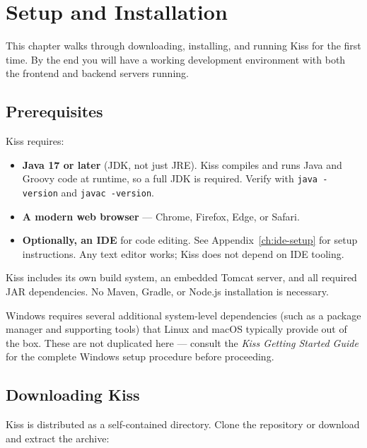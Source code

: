 \chapter{Setup and Installation}
\label{ch:setup}

This chapter walks through downloading, installing, and running Kiss for the first time.  By the end you will have a working development environment with both the frontend and backend servers running.

\section{Prerequisites}
\label{sec:setup-prerequisites}

Kiss requires:

\begin{itemize}
  \item \textbf{Java 17 or later} (JDK, not just JRE).  Kiss compiles and runs Java and Groovy code at runtime, so a full JDK is required.  Verify with \texttt{java -version} and \texttt{javac -version}.
  \item \textbf{A modern web browser} --- Chrome, Firefox, Edge, or Safari.
  \item \textbf{Optionally, an IDE} for code editing.  See Appendix~\ref{ch:ide-setup} for setup instructions.  Any text editor works; Kiss does not depend on IDE tooling.
\end{itemize}

\begin{notebox}
Kiss includes its own build system, an embedded Tomcat server, and all required JAR dependencies.  No Maven, Gradle, or Node.js installation is necessary.
\end{notebox}

\begin{warnbox}
Windows requires several additional system-level dependencies (such as a package manager and supporting tools) that Linux and macOS typically provide out of the box.  These are not duplicated here --- consult the \emph{Kiss Getting Started Guide} for the complete Windows setup procedure before proceeding.
\end{warnbox}

\section{Downloading Kiss}
\label{sec:setup-download}

Kiss is distributed as a self-contained directory.  Clone the repository or download and extract the archive:

